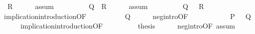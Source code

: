 \begin{isabellebody}
\ {}{\isacharcolon}{\kern0pt}\ {\isachardoublequoteopen}{\isasymnot}R{\isachardoublequoteclose}\isanewline
\ \ \ \ \isamarkupfalse%
\ assum{}\isanewline
\ \ \ \ \isacommand{{\isachardot}{\kern0pt}}\isamarkupfalse%
\isanewline
\ \ \isamarkupfalse%
\ {}{\isacharcolon}{\kern0pt}\ {\isachardoublequoteopen}Q\ {\isasymlongrightarrow}\ R{\isachardoublequoteclose}\isanewline
\ \ \ \ \isamarkupfalse%
\ assum{}\isanewline
\ \ \ \ \isacommand{{\isachardot}{\kern0pt}}\isamarkupfalse%
\isanewline
\ \ \isamarkupfalse%
\ {}{\isacharcolon}{\kern0pt}\ {\isachardoublequoteopen}Q\ {\isasymlongrightarrow}\ {\isasymnot}\ R{\isachardoublequoteclose}\isanewline
\ \ \ \ \isamarkupfalse%
\ implication{\isacharunderscore}{\kern0pt}introduction{\isacharbrackleft}{\kern0pt}OF\ {}{\isacharbrackright}{\kern0pt}\isanewline
\ \ \ \ \isacommand{{\isachardot}{\kern0pt}}\isamarkupfalse%
\isanewline
\ \ \isamarkupfalse%
\ {}{\isacharcolon}{\kern0pt}\ {\isachardoublequoteopen}{\isasymnot}Q{\isachardoublequoteclose}\isanewline
\ \ \ \ \isamarkupfalse%
\ neg{\isacharunderscore}{\kern0pt}intro{\isacharbrackleft}{\kern0pt}OF\ {}\ {}{\isacharbrackright}{\kern0pt}\isanewline
\ \ \ \ \isacommand{{\isachardot}{\kern0pt}}\isamarkupfalse%
\isanewline
\ \ \isamarkupfalse%
\ {}{\isacharcolon}{\kern0pt}\ {\isachardoublequoteopen}P\ {\isasymlongrightarrow}\ {\isasymnot}\ Q{\isachardoublequoteclose}\isanewline
\ \ \ \ \isamarkupfalse%
\ implication{\isacharunderscore}{\kern0pt}introduction{\isacharbrackleft}{\kern0pt}OF\ {}{\isacharbrackright}{\kern0pt}\isanewline
\ \ \ \ \isacommand{{\isachardot}{\kern0pt}}\isamarkupfalse%
\isanewline
\ \ \isamarkupfalse%
\ {\isacharquery}{\kern0pt}thesis\isanewline
\ \ \ \ \isamarkupfalse%
\ neg{\isacharunderscore}{\kern0pt}intro{\isacharbrackleft}{\kern0pt}OF\ assum{}\ {}{\isacharbrackright}{\kern0pt}\isanewline
\ \ \ \ \isacommand{{\isachardot}{\kern0pt}}\isamarkupfalse%
\isanewline
{}\isamarkupfalse%
%
\endisatagproof
{\isafoldproof}%
%
\isadelimproof
\isanewline
%
\endisadelimproof
\isanewline
\isanewline
%
\isadelimtheory
\isanewline
%
\endisadelimtheory
%
\isatagtheory
{}\isamarkupfalse%
%
\endisatagtheory
{\isafoldtheory}%
%
\isadelimtheory
%
\endisadelimtheory
%
\end{isabellebody}%
